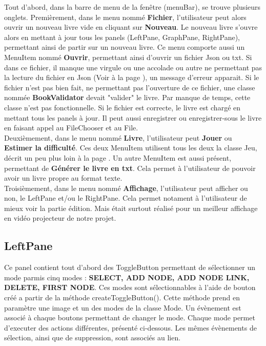 			Tout d'abord, dans la barre de menu de la fenêtre (menuBar), se trouve plusieurs onglets.
			Premièrement, dans le menu nommé \textbf{Fichier}, l'utilisateur peut alors ouvrir un nouveau livre vide en cliquant sur \textbf{Nouveau}. Le nouveau livre s'ouvre alors en mettant à jour tous les panels (LeftPane, GraphPane, RightPane), permettant ainsi de partir sur un nouveau livre. Ce menu comporte aussi un MenuItem nommé \textbf{Ouvrir}, permettant ainsi d'ouvrir un fichier Json ou txt. Si dans ce fichier, il manque une virgule ou une accolade ou autre ne permettant pas la lecture du fichier en Json (Voir  à la page \pageref{sec:Json}), un message d'erreur apparait. Si le fichier n'est pas bien fait, ne permettant pas l'ouverture de ce fichier, une classe nommée \textbf{BookValidator} devait "valider" le livre. Par manque de temps, cette classe n'est pas fonctionnelle. Si le fichier est correcte, le livre est chargé en mettant tous les panels à jour. Il peut aussi enregistrer ou enregistrer-sous le livre en faisant appel au FileChooser et au File.\\
			Deuxièmement, dans le menu nommé \textbf{Livre}, l'utilisateur peut \textbf{Jouer} ou \textbf{Estimer la difficulté}. Ces deux MenuItem utilisent tous les deux la classe Jeu, décrit un peu plus loin  à la page \pageref{sec:Jeu}. Un autre MenuItem est aussi présent, permettant de \textbf{Générer le livre en txt}. Cela permet à l'utilisateur de pouvoir avoir un livre propre au format texte.\\
			Troisièmement, dans le menu nommé \textbf{Affichage}, l'utilisateur peut afficher ou non, le LeftPane et/ou le RightPane. Cela permet notament à l'utilisateur de mieux voir la partie édition. Mais était surtout réalisé pour un meilleur affichage en vidéo projecteur de notre projet.


		\subsection{LeftPane}
			Ce panel contient tout d'abord des ToggleButton permettant de sélectionner un mode parmis cinq modes : \textbf{SELECT, ADD NODE, ADD NODE LINK, DELETE, FIRST NODE}. Ces modes sont sélectionnables à l'aide de bouton créé a partir de la méthode createToggleButton(). Cette méthode prend en paramètre une image et un des modes de la classe Mode. Un évènement est associé à chaque boutons permettant de changer le mode. Chaque mode permet d'executer des actions différentes, présenté ci-dessous. Les mêmes évènements de sélection, ainsi que de suppression, sont associés au lien.

